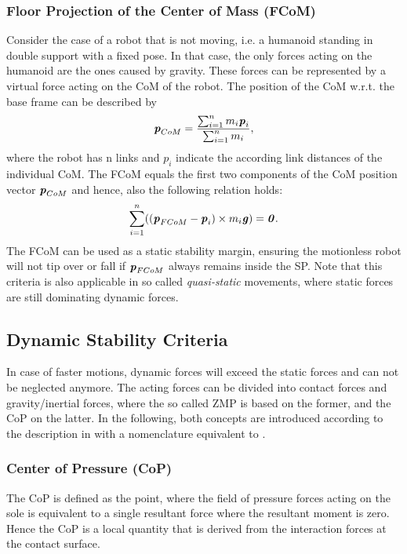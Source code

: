 \subsubsection{Floor Projection of the Center of Mass (FCoM)}
Consider the case of a robot that is not moving, i.e. a humanoid standing in double support with a fixed pose. In that case, the only forces acting on the humanoid are the ones caused by gravity. These forces can be represented by a virtual force acting on the \gls{CoM} of the robot. The position of the \gls{CoM} w.r.t. the base frame can be described by
\begin{equation*} 
\bm{\mathit{p}}_{CoM}=\dfrac{\sum_{i=1}^{n}m_i\bm{\mathit{p}}_i}{\sum_{i=1}^{n}m_i},
\end{equation*}
where the robot has n links and $p_i$ indicate the according link distances of the individual \gls{CoM}. The \gls{FCoM} equals the first two components of the \gls{CoM} position vector $\bm{\mathit{p}}_{CoM}$ and hence, also the following relation holds:
\begin{equation*} 
\sum_{i=1}^{n}((\bm{\mathit{p}}_{FCoM}-\bm{\mathit{p}}_i)\times m_i\bm{\mathit{g}})=\bm{\mathit{0}}.
\end{equation*}
The \gls{FCoM} can be used as a static stability margin, ensuring the motionless robot will not tip over or fall if $\bm{\mathit{p}}_{FCoM}$ always remains inside the \gls{SP}. Note that this criteria is also applicable in so called \textit{quasi-static} movements, where static forces are still dominating dynamic forces.

\subsection{Dynamic Stability Criteria}
In case of faster motions, dynamic forces will exceed the static forces and can not be neglected anymore. The acting forces can be divided into contact forces and gravity/inertial forces, where the so called \gls{ZMP} is based on the former, and the \gls{CoP} on the latter. In the following, both concepts are introduced according to the description in \cite{sardain2004forces} with a nomenclature equivalent to \cite{scaronTeaching}.
\subsubsection{Center of Pressure (CoP)}
The \gls{CoP} is defined as the point, where the field of pressure forces acting on the sole is equivalent to a single resultant force where the resultant moment is zero. Hence the \gls{CoP} is a local quantity that is derived from the interaction forces at the contact surface. 

